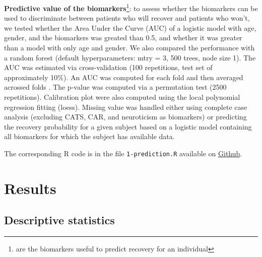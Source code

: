 \documentclass[12pt]{article}
\begin{document}
\clearpage

\textbf{Predictive value of the biomarkers}\footnote{are the biomarkers useful to
 predict recovery for an individual}: to assess whether the biomarkers
 can be used to discriminate between patients who will recover and
 patients who won't, we tested whether the Area Under the Curve (AUC)
 of a logistic model with age, gender, and the biomarkers was greated
 than 0.5, and whether it was greater than a model with only age and
 gender. We also compared the performance with a random forest
 (default hyperparameters: mtry = 3, 500 trees, node size 1). The AUC
 was estimated via cross-validation (100 repetitions, test set of
 approximately 10\%). An AUC was computed for each fold and then
 averaged acrossed folds \citep{ledell2015computationally}. The p-value
 was computed via a permutation test (2500 repetitions). \newline
 Calibration plot were also computed using the local polynomial
 regression fitting (loess). \newline Missing value was handled either
 using complete case analysis (excluding CATS, CAR, and neuroticism as
 biomarkers) or predicting the recovery probability for a given
 subject based on a logistic model containing all biomarkers for which
 the subject has available data.

\bigskip

The corresponding R code is in the file \texttt{1-prediction.R} available on
\href{https://github.com/bozenne/article-predictionNP1BD3/code-data-analysis}{Github}.

\clearpage

\section{Results}
\label{sec:orgab9a0b6}

\subsection{Descriptive statistics}
\label{sec:orgd70b583}
\end{document}

